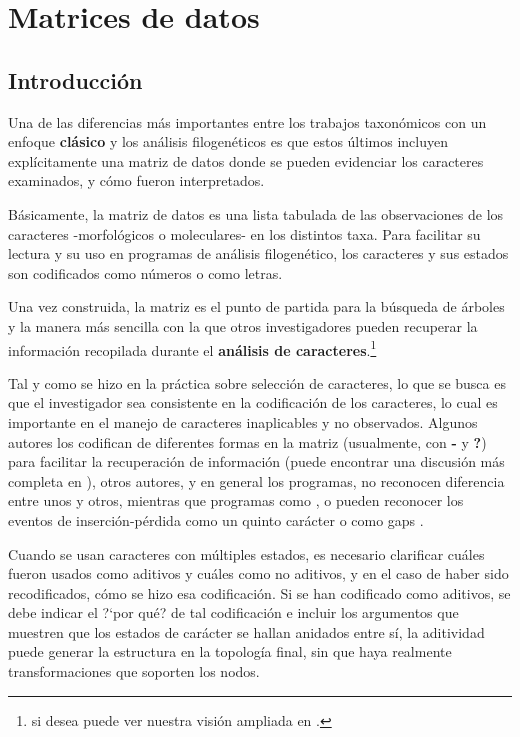 \chapter{Matrices de datos}
\label{cha:matrices}

\section*{Introducci\'on}

Una de las diferencias m\'as importantes entre los trabajos taxon\'omicos con un enfoque \textbf{cl\'asico} y los an\'alisis filogen\'eticos es que estos \'ultimos incluyen expl\'icitamente una matriz de datos donde se pueden evidenciar los caracteres examinados, y c\'omo fueron interpretados.

B\'asicamente, la matriz de datos es una lista tabulada de las observaciones de los caracteres -morfol\'ogicos o moleculares- en los distintos taxa. Para facilitar su lectura y su uso en programas de an\'alisis filogen\'etico, los caracteres y sus estados son codificados como n\'umeros o como letras.

Una vez construida, la matriz es el punto de partida para la b\'usqueda de \'arboles y la manera m\'as sencilla con la que otros investigadores pueden recuperar la informaci\'on recopilada durante el \textbf{an\'alisis de caracteres}.\footnote{si desea puede ver nuestra visi\'on ampliada en \cite{Mirandaetal2004}.}

Tal y como se hizo en la pr\'actica sobre selecci\'on de caracteres, lo que se busca es que el investigador sea consistente en la codificaci\'on de los caracteres, lo cual es importante en el manejo de caracteres inaplicables y no observados. Algunos autores los codifican de diferentes formas en la matriz (usualmente, con \textbf {-} y \textbf {?}) para facilitar la recuperaci\'on de informaci\'on (puede encontrar una discusi\'on m\'as completa en \cite{Strong1999}), otros autores, y en general los programas, no reconocen diferencia entre unos y otros, mientras que programas como ,  o  pueden reconocer los eventos de inserci\'on-p\'erdida como un quinto car\'acter o como gaps \citep{Giribet1999}.

Cuando se usan caracteres con m\'ultiples estados, es necesario {cla}{ri}{fi}{car} cu\'ales fueron usados como aditivos y cu\'ales como no aditivos, y en el caso de haber sido recodificados, c\'omo se hizo esa codificaci\'on. 
Si se han codificado como aditivos, se debe indicar el ?`por qu\'e? de tal codificaci\'on e incluir los argumentos que muestren que los estados de car\'acter se hallan anidados entre s\'i, la aditividad puede generar la estructura en la topolog\'ia final, sin que haya realmente transformaciones que soporten los nodos.

